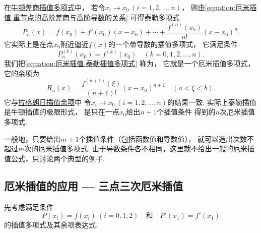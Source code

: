 在\hyperref[equation:牛顿插值.牛顿差商插值多项式]{牛顿差商插值多项式}中，
若令\(x_i \to x_0\ (i=1,2,\dotsc,n)\)，
则由\cref{equation:厄米插值.重节点的高阶差商与高阶导数的关系}
可得泰勒多项式\begin{equation}\label{equation:厄米插值.泰勒插值多项式}
	P_n(x)
	= f(x_0)
	+ f'(x_0) (x-x_0)
	+ \dotsb
	+ \frac{f^{(n)}(x_0)}{n!} (x-x_0)^n.
\end{equation}
它实际上是在点\(x_0\)附近逼近\(f(x)\)的一个带导数的插值多项式，
它满足条件\begin{equation}\label{equation:厄米插值.泰勒插值多项式的高阶导数}
	P_n^{(k)}(x_0)
	= f^{(k)}(x_0)
	\quad(k=0,1,2,\dotsc,n).
\end{equation}
我们把\cref{equation:厄米插值.泰勒插值多项式} 称为，
它就是一个厄米插值多项式，
它的余项为\begin{equation*}
	R_n(x)
	= \frac{f^{(n+1)}(\xi)}{(n+1)!} (x-x_0)^{n+1}
	\quad(a < \xi < b).
\end{equation*}
它与\hyperref[equation:拉格朗日插值.拉格朗日插值余项]{拉格朗日插值余项}中
令\(x_i \to x_0\ (i=1,2,\dotsc,n)\)的结果一致.
实际上泰勒插值是牛顿插值的极限形式，
是只在一点\(x_0\)给出\(n+1\)个插值条件 
得到的\(n\)次厄米插值多项式.

一般地，只要给出\(m+1\)个插值条件（包括函数值和导数值），
就可以造出次数不超过\(m\)次的厄米插值多项式.
由于导数条件各不相同，这里就不给出一般的厄米插值公式，只讨论两个典型的例子.

\subsection{厄米插值的应用 --- 三点三次厄米插值}
先考虑满足条件\begin{equation*}
	P(x_i) = f(x_i)
	\ (i=0,1,2)
	\quad\text{和}\quad
	P'(x_1) = f'(x_1)
\end{equation*}
的插值多项式及其余项表达式.


